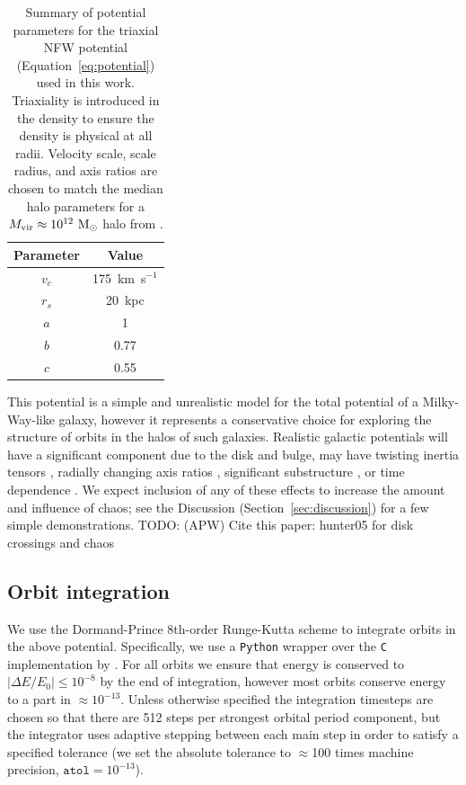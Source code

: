 \documentclass[letterpaper,12pt,preprint]{aastex}
\newcommand{\msun}{\ensuremath{\mathrm{M}_\odot}}
\newcommand{\todo}[2]{{\color{red} TODO: (\MakeUppercase{#1}) #2}}
\begin{document}
\begin{table}[ht]
\begin{center}
	\begin{tabular}{ c  c }
	         Parameter & Value\\\toprule
		$v_c$ & 175~km~s$^{-1}$\\
		$r_s$ & 20~kpc\\
		$a$ & 1\\
		$b$ & 0.77\\
		$c$ & 0.55\\
		\bottomrule
		\end{tabular}
	\caption{Summary of potential parameters for the triaxial NFW potential (Equation~\ref{eq:potential}) used in this work. Triaxiality is introduced in the density to ensure the density is physical at all radii. Velocity scale, scale radius, and axis ratios are chosen to match the median halo parameters for a $M_{\rm vir} \approx 10^{12}~\msun$ halo from \citep{jing02}. \label{tbl:potential}}
\end{center}
\end{table}

This potential is a simple and unrealistic model for the total potential of a Milky-Way-like galaxy, however it represents a conservative choice for exploring the structure of orbits in the halos of such galaxies. Realistic galactic potentials will have a significant component due to the disk and bulge, may have twisting inertia tensors \citep{romanowsky98}, radially changing axis ratios \citep[e.g.,][]{kazantzidis04,debattista08,veraciro11,butsky15}, significant substructure \citep{moore98,zemp09}, or time dependence \citep[either from bulk rotation, mass growth, mergers, etc.; see, e.g.,][]{bailin05}. We expect inclusion of any of these effects to increase the amount and influence of chaos; see the Discussion (Section~\ref{sec:discussion}) for a few simple demonstrations. \todo{apw}{Cite this paper: hunter05 for disk crossings and chaos}

\subsection{Orbit integration}\label{sec:integration}

We use the Dormand-Prince 8th-order Runge-Kutta scheme \citep{prince81} to integrate orbits in the above potential. Specifically, we use a \texttt{Python} wrapper over the \texttt{C} implementation by \cite{hairer93}. For all orbits we ensure that energy is conserved to $|\Delta E/E_0| \leq 10^{-8}$ by the end of integration, however most orbits conserve energy to a part in $\approx$$10^{-13}$. Unless otherwise specified the integration timesteps are chosen so that there are 512 steps per strongest orbital period component, but the integrator uses adaptive stepping between each main step in order to satisfy a specified tolerance (we set the absolute tolerance to $\approx$100 times machine precision, $\texttt{atol} = 10^{-13}$). 
\end{document}

